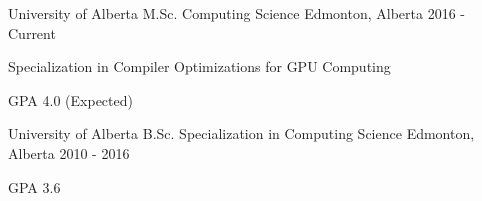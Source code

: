 
\begin{cventries}
    \cventry
        {University of Alberta} %
        {M.Sc. Computing Science} %
        {Edmonton, Alberta} %
        {2016 - Current} %
        {
          \begin{cvitems}
              \item Specialization in Compiler Optimizations for GPU Computing
              \item GPA 4.0 (Expected)
          \end{cvitems}
        }
    \cventry
        {University of Alberta} %
        {B.Sc. Specialization in Computing Science} %
        {Edmonton, Alberta} %
        {2010 - 2016} %
        {
            \begin{cvitems}
                \item GPA 3.6
            \end{cvitems}
        }
\end{cventries}
